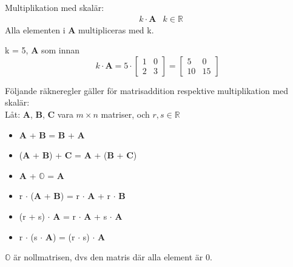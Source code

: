 \noindent
Multiplikation med skalär: 
\begin{align*}
&k \cdot \mathbf{A} &k \in \mathbb{R}
\end{align*}
Alla elementen i \textbf{A} multipliceras med k.
\begin{Ex}
    k = 5, \textbf{A} som innan
    \[
        k \cdot \mathbf{A} = 5 \cdot \begin{bmatrix} 1&0\\2&3 \end{bmatrix} = \begin{bmatrix} 5&0\\10&15 \end{bmatrix}
    \]
\end{Ex}
Följande räkneregler gäller för matrisaddition respektive multiplikation med skalär:\\
Låt: \textbf{A}, \textbf{B}, \textbf{C} vara $m \times n$ matriser, och $r,s \in \mathbb{R}$
\begin{itemize}
	\item \textbf{A} + \textbf{B} = \textbf{B} + \textbf{A}
	\item (\textbf{A} + \textbf{B}) + \textbf{C} = \textbf{A} + (\textbf{B} + \textbf{C})
	\item \textbf{A} + $\mathbb{O}$ = \textbf{A}
	\item r $\cdot$ (\textbf{A} + \textbf{B}) = r $\cdot$ \textbf{A} + r $\cdot$ \textbf{B}
	\item (r + s) $\cdot$ \textbf{A} = r $\cdot$ \textbf{A} + s $\cdot$ \textbf{A}
	\item r $\cdot$ (s $\cdot$ \textbf{A}) = (r $\cdot$ s) $\cdot$ \textbf{A}
\end{itemize}
\begin{Rem}
    $\mathbb{O}$ är nollmatrisen, dvs den matris där alla element är 0.
\end{Rem}



